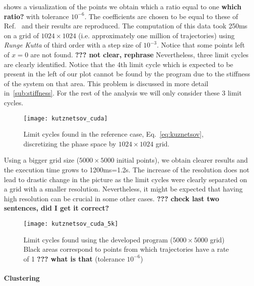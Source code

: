 \pagebreak
{} shows a visualization of the points we obtain which a ratio equal to one 
{\bf which ratio?}
with tolerance $10^{-6}$. 
The coefficients are chosen to be equal to these of Ref.~\cite{kuznetsov_visualization_2013} and their results are reproduced. The computation of this data took 250ms on a grid of $1024 \times 1024$ (i.e. approximately one million of trajectories) using \emph{Runge Kutta} of third order with a step size of $10^{-3}$. Notice that some points left of $x = 0$ are not found. 
{\bf ??? not clear, rephrase}
Nevertheless, three limit cycles are clearly identified. Notice that the
4th limit cycle which is expected to be present in the left of our plot cannot be found by the program due to the stiffness of the system on that area. This problem is discussed in more detail in~\cref{sub:stiffness}. For the rest of the analysis we will only consider these 3 limit cycles.
\begin{figure}[H]
    \centering
    \texttt{[image: kutznetsov\_cuda]}
    \caption{Limit cycles found in the reference case, Eq.~\ref{eq:kuznetsov}, discretizing the phase space by $1024\times 1024$ grid.
    } 
    \label{fig:kuznetsov_cuda}
\end{figure}

Using a bigger grid size ($5000\times5000$ initial points), we obtain clearer results and the execution time grows to 1200ms=1.2s. 
The increase of the resolution does not lead to drastic change in the picture as the limit cycles were clearly separated on a grid with a smaller resolution. 
Nevertheless, it might be expected that having high resolution can be crucial in some other cases.
{\bf ??? check last two sentences, did I get it correct?}

\begin{figure}[H]
\centering
\texttt{[image: kutznetsov\_cuda\_5k]}
\caption{Limit cycles found using the developed program ($5000\times 5000$ grid)\\
Black areas correspond to points from which trajectories have a rate of 1 {\bf ??? what is that}  (tolerance $10^{-6}$)
}
\label{fig:kuznetsov_cuda_5k}
\end{figure}

\paragraph{Clustering}

